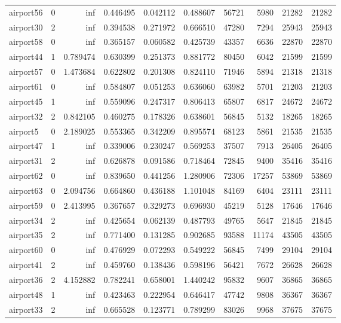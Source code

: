 \begin{longtable}{|l|r|r|r|r|r|r|r|r|r|}
airport56 & 0 & inf & 0.446495 & 0.042112 & 0.488607 & 56721 & 5980 & 21282 & 21282 \\
airport30 & 2 & inf & 0.394538 & 0.271972 & 0.666510 & 47280 & 7294 & 25943 & 25943 \\
airport58 & 0 & inf & 0.365157 & 0.060582 & 0.425739 & 43357 & 6636 & 22870 & 22870 \\
airport44 & 1 & 0.789474 & 0.630399 & 0.251373 & 0.881772 & 80450 & 6042 & 21599 & 21599 \\
airport57 & 0 & 1.473684 & 0.622802 & 0.201308 & 0.824110 & 71946 & 5894 & 21318 & 21318 \\
airport61 & 0 & inf & 0.584807 & 0.051253 & 0.636060 & 63982 & 5701 & 21203 & 21203 \\
airport45 & 1 & inf & 0.559096 & 0.247317 & 0.806413 & 65807 & 6817 & 24672 & 24672 \\
airport32 & 2 & 0.842105 & 0.460275 & 0.178326 & 0.638601 & 56845 & 5132 & 18265 & 18265 \\
airport5 & 0 & 2.189025 & 0.553365 & 0.342209 & 0.895574 & 68123 & 5861 & 21535 & 21535 \\
airport47 & 1 & inf & 0.339006 & 0.230247 & 0.569253 & 37507 & 7913 & 26405 & 26405 \\
airport31 & 2 & inf & 0.626878 & 0.091586 & 0.718464 & 72845 & 9400 & 35416 & 35416 \\
airport62 & 0 & inf & 0.839650 & 0.441256 & 1.280906 & 72306 & 17257 & 53869 & 53869 \\
airport63 & 0 & 2.094756 & 0.664860 & 0.436188 & 1.101048 & 84169 & 6404 & 23111 & 23111 \\
airport59 & 0 & 2.413995 & 0.367657 & 0.329273 & 0.696930 & 45219 & 5128 & 17646 & 17646 \\
airport34 & 2 & inf & 0.425654 & 0.062139 & 0.487793 & 49765 & 5647 & 21845 & 21845 \\
airport35 & 2 & inf & 0.771400 & 0.131285 & 0.902685 & 93588 & 11174 & 43505 & 43505 \\
airport60 & 0 & inf & 0.476929 & 0.072293 & 0.549222 & 56845 & 7499 & 29104 & 29104 \\
airport41 & 2 & inf & 0.459760 & 0.138436 & 0.598196 & 56421 & 7672 & 26628 & 26628 \\
airport36 & 2 & 4.152882 & 0.782241 & 0.658001 & 1.440242 & 95832 & 9607 & 36865 & 36865 \\
airport48 & 1 & inf & 0.423463 & 0.222954 & 0.646417 & 47742 & 9808 & 36367 & 36367 \\
airport33 & 2 & inf & 0.665528 & 0.123771 & 0.789299 & 83026 & 9968 & 37675 & 37675 \\

\end{longtable}
